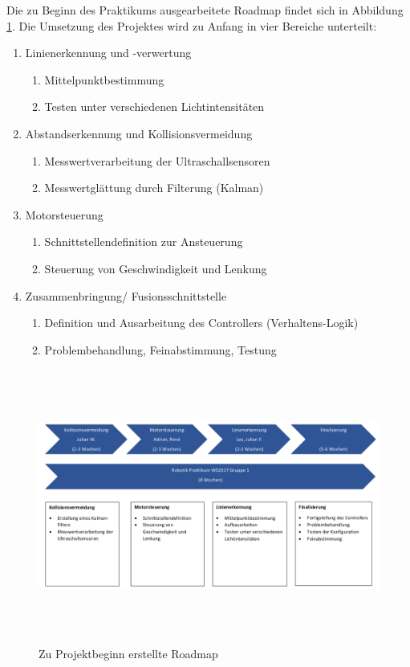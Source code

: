 \documentclass[12pt, a4paper]{scrartcl}
\begin{document}
Die zu Beginn des Praktikums ausgearbeitete Roadmap findet sich in Abbildung \ref{img:Roadmap_Gr1}.
\newpage
Die Umsetzung des Projektes wird zu Anfang in vier Bereiche unterteilt:
\begin{enumerate}
		\item{Linienerkennung und -verwertung
		\begin{enumerate}
			\item Mittelpunktbestimmung
			\item Testen unter verschiedenen Lichtintensitäten
	\end{enumerate}}
	\item{Abstandserkennung und Kollisionsvermeidung
	\begin{enumerate}
		\item Messwertverarbeitung der Ultraschallsensoren
		\item Messwertglättung durch Filterung (Kalman)
	\end{enumerate}}
	\item {Motorsteuerung
		\begin{enumerate}
		\item Schnittstellendefinition zur Ansteuerung
		\item Steuerung von Geschwindigkeit und Lenkung
		\end{enumerate}}
		\item{Zusammenbringung/ Fusionsschnittstelle
		\begin{enumerate}
			\item Definition und Ausarbeitung des Controllers (Verhaltens-Logik)
			\item Problembehandlung, Feinabstimmung, Testung
		\end{enumerate}}
\end{enumerate}

\begin{figure}
\centering
\includegraphics[width=\textwidth, height=9cm, keepaspectratio]{Bilder/Roadmap_Gr1.pdf}
\caption{Zu Projektbeginn erstellte Roadmap}
\label{img:Roadmap_Gr1}
\end{figure}
\end{document}
